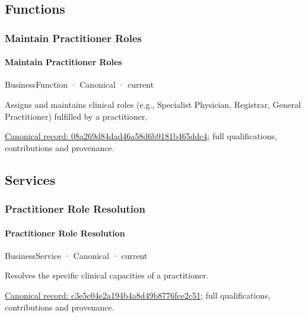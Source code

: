 \subsection{Functions}

\subsubsection{Maintain Practitioner Roles}

\paragraph{Maintain Practitioner Roles}

\label{element:08a269d84dad46a58d6b9181b465ddc4}
{\small BusinessFunction · Canonical · current}\par

Assigns and maintains clinical roles (e.g., Specialist Physician, Registrar, General Practitioner) fulfilled by a practitioner.


{\footnotesize \href{../../../../continuum/business/business-function/08a269d84dad46a58d6b9181b465ddc4.md}{Canonical record: 08a269d84dad46a58d6b9181b465ddc4}; full qualifications, contributions and provenance.}\par
\subsection{Services}

\subsubsection{Practitioner Role Resolution}

\paragraph{Practitioner Role Resolution}

\label{element:c3e5c04e2a194b4a8d49b8776fce2c51}
{\small BusinessService · Canonical · current}\par

Resolves the specific clinical capacities of a practitioner.


{\footnotesize \href{../../../../continuum/business/business-service/c3e5c04e2a194b4a8d49b8776fce2c51.md}{Canonical record: c3e5c04e2a194b4a8d49b8776fce2c51}; full qualifications, contributions and provenance.}\par
